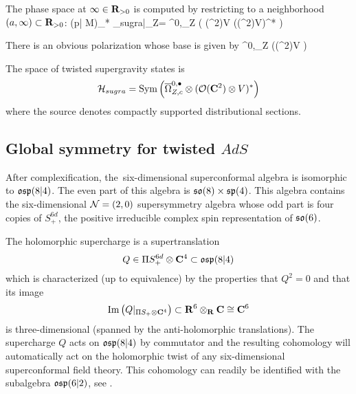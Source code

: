 The phase space at $\infty\in \mathbf{R}_{>0}$ is computed by restricting to a neighborhood $(a, \infty)\subset \mathbf{R}_{>0}$:
\beqn
(p| \mathring M)_* \cL_{sugra}|_{\infty \times Z}= \Omega^{0,\bu}_Z \otimes \left ( \cO (\C^{2})\otimes V  \Pi (\cO (\C^{2})\otimes V)^{*} \right )
\eeqn

There is an obvious polarization whose base is given by
\beqn
\Omega^{0,\bullet}_Z \otimes \left (\cO (\C^{2})\otimes V \right )
\eeqn


\begin{dfn}
\label{dfn:states}
  The space of twisted supergravity states is
  \[ \mathcal H_{sugra} = \operatorname{Sym} \left(\overline \Omega^{0,\bullet}_{Z, c} \otimes (\mathcal O (\mathbf{C}^{2}) \otimes V)^{*} \right)\]
where the source denotes compactly supported distributional sections.
\end{dfn}

\subsection{Global symmetry for twisted $AdS$}
\label{s:global1}

After complexification, the~six-dimensional superconformal algebra is isomorphic to $\mathfrak{osp}(8|4)$.
The even part of this algebra is $\mathfrak{so}(8) \times \mathfrak{sp}(4)$.
This algebra contains the six-dimensional $\mathcal N=(2,0)$ supersymmetry algebra whose odd part is four copies of $S^{6d}_+$, the positive irreducible complex spin representation of $\mathfrak{so}(6)$.

The holomorphic supercharge is a supertranslation
\[
Q \in \Pi S^{6d}_+ \otimes \mathbf{C}^4 \subset \mathfrak{osp}(8|4)
\]
which is characterized (up to equivalence) by the properties that $Q^2 = 0$ and that its image
\[
{\rm Im}\left(Q|_{\Pi S_+ \otimes \mathbf{C}^4} \right) \subset \mathbf{R}^6 \otimes_{\mathbf{R}} \mathbf{C} \cong \mathbf{C}^6
\]
is three-dimensional (spanned by the anti-holomorphic translations). 
The supercharge $Q$ acts on $\mathfrak{osp}(8|4)$ by commutator and the resulting cohomology will automatically act on the holomorphic twist of any six-dimensional superconformal field theory. 
This cohomology can readily be identified with the subalgebra $\mathfrak{osp}(6|2)$, see \cite{SWsuco2}. 


